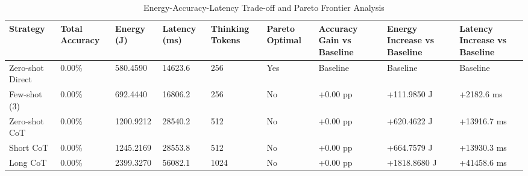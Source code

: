 \begin{table}
\caption{Energy-Accuracy-Latency Trade-off and Pareto Frontier Analysis}
\label{tab:tradeoff_comparison}
\begin{tabular}{lllllllll}
\toprule
Strategy & Total Accuracy & Energy (J) & Latency (ms) & Thinking Tokens & Pareto Optimal & Accuracy Gain vs Baseline & Energy Increase vs Baseline & Latency Increase vs Baseline \\
\midrule
Zero-shot Direct & 0.00\% & 580.4590 & 14623.6 & 256 & Yes & Baseline & Baseline & Baseline \\
Few-shot (3) & 0.00\% & 692.4440 & 16806.2 & 256 & No & +0.00 pp & +111.9850 J & +2182.6 ms \\
Zero-shot CoT & 0.00\% & 1200.9212 & 28540.2 & 512 & No & +0.00 pp & +620.4622 J & +13916.7 ms \\
Short CoT & 0.00\% & 1245.2169 & 28553.8 & 512 & No & +0.00 pp & +664.7579 J & +13930.3 ms \\
Long CoT & 0.00\% & 2399.3270 & 56082.1 & 1024 & No & +0.00 pp & +1818.8680 J & +41458.6 ms \\
\bottomrule
\end{tabular}
\end{table}
